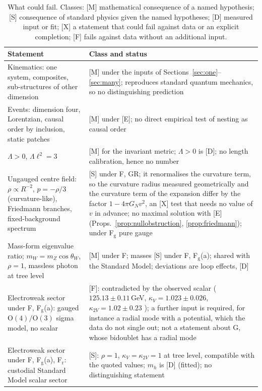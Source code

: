 \documentclass[aps,pra,onecolumn,superscriptaddress,nofootinbib,10pt]{revtex4-2}
\theoremstyle{definition}
\theoremstyle{remark}
\newcommand{\OO}{\mathrm{O}}
\begin{document}
\begin{table}[h]
\caption{What could fail.  Classes: [M] mathematical consequence of a named hypothesis; [S] consequence of
standard physics given the named hypotheses; [D] measured input or fit; [X] a statement that could fail
against data or an explicit completion; [F] fails against data without an additional input.}
\label{tab:falsify}
\footnotesize
\begin{tabular}{@{}p{}p{}@{}}
\toprule
Statement & Class and status\\
\midrule
Kinematics: one system, composites, sub-structures of other dimension & [M] under the inputs of Sections~\ref{sec:one}--\ref{sec:many}; reproduces standard quantum mechanics, so no distinguishing prediction\\
Events: dimension four, Lorentzian, causal order by inclusion, static patches & [M] under [E]; no direct empirical test of nesting as causal order\\
$\Lambda>0$, $\Lambda\ell^2=3$ & [M] for the invariant metric; $\Lambda>0$ is [D]; no length calibration, hence no number\\
Ungauged centre field: $\rho\propto R^{-2}$, $p=-\rho/3$ (curvature-like), Friedmann branches, fixed-background spectrum & [S] under F, GR; it renormalises the curvature term, so the curvature radius measured geometrically and the curvature term of the expansion differ by the factor $1-4\pi G_Nv^2$, an [X] test that needs no value of $v$ in advance; no maximal solution with [E] (Props.~\ref{prop:nullobstruction}, \ref{prop:friedmann}); under F$_{\mathrm g}$ pure gauge\\
Mass-form eigenvalue ratio; $m_W=m_Z\cos\theta_W$, $\rho=1$, massless photon at tree level & [M] under F; masses [S] under F, F$_{\mathrm g}$(a); shared with the Standard Model; deviations are loop effects, [D]\\
Electroweak sector under F, F$_{\mathrm g}$(a): gauged $\OO(4)/\OO(3)$ sigma model, no scalar & [F]: contradicted by the observed scalar ($125.13\pm0.11$\,GeV, $\kappa_V=1.023\pm0.026$, $\kappa_{2V}=1.02\pm0.23$ \cite{ex-PDG26}); a further input is required, for instance a radial mode with a potential, which the data do not single out; not a statement about G, whose bidoublet has a radial mode\\
Electroweak sector under F, F$_{\mathrm g}$(a), F$_{\mathrm r}$: custodial Standard Model scalar sector & [S]: $\rho=1$, $\kappa_V=\kappa_{2V}=1$ at tree level, compatible with the quoted values; $m_h$ is [D] (fitted); no distinguishing statement\\

\end{tabular}
\end{table}
\end{document}
